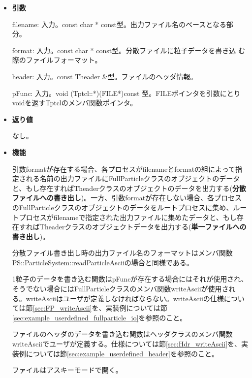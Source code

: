\begin{itemize}

\item{{\bf 引数}}

  filename: 入力。const char * const型。出力ファイル名のベースとなる部
  分。

  format: 入力。const char * const型。分散ファイルに粒子データを書き込
  む際のファイルフォーマット。

  header: 入力。const Theader \&型。ファイルのヘッダ情報。
  
  pFunc: 入力。void (Tptcl::*)(FILE*)const 型。FILEポインタを引数にとりvoidを返すTptclのメンバ関数ポインタ。


\item{{\bf 返り値}}

  なし。

\item{{\bf 機能}}

引数formatが存在する場合、各プロセスがfilenameとformatの組によって指定される名前の出力ファイルにFullParticleクラスのオブジェクトのデータと、もし存在すればTheaderクラスのオブジェクトのデータを出力する(\textbf{分散ファイルへの書き出し})。一方、引数formatが存在しない場合、各プロセスのFullParticleクラスのオブジェクトのデータをルートプロセスに集め、ルートプロセスがfilenameで指定された出力ファイルに集めたデータと、もし存在すればTheaderクラスのオブジェクトデータを出力する(\textbf{単一ファイルへの書き出し})。


分散ファイル書き出し時の出力ファイル名のフォーマットはメンバ関数\\PS::ParticleSystem::readParticleAsciiの場合と同様である。
  
1粒子のデータを書き込む関数はpFuncが存在する場合にはそれが使用され、そうでない場合にはFullParticleクラスのメンバ関数writeAsciiが使用される。writeAsciiはユーザが定義しなければならない。writeAsciiの仕様については節\ref{sec:FP_writeAscii}を、実装例については節\ref{sec:example_userdefined_fullparticle_io}を参照のこと。

ファイルのヘッダのデータを書き込む関数はヘッダクラスのメンバ関数writeAsciiでユーザが定義する。仕様については節\ref{sec:Hdr_writeAscii}を、実装例については節\ref{sec:example_userdefined_header}を参照のこと。

ファイルはアスキーモードで開く。

\end{itemize}


\label{sec:writeParticleBinary}

